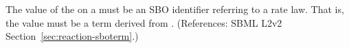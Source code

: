 The value of the   on a \KineticLaw must be an SBO
identifier referring to a rate law.  That is, the value must be a term
derived from \sboratelaw.  (References: SBML L2v2
Section~\ref{sec:reaction-sboterm}.)
